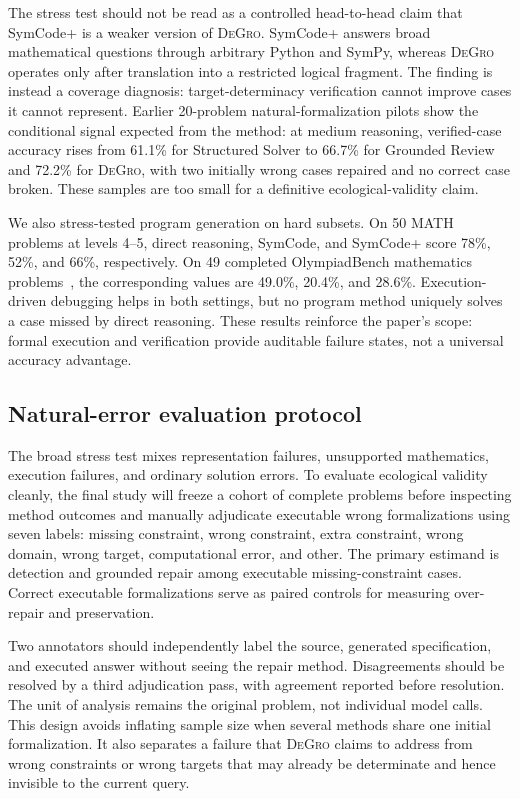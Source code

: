 \documentclass[sigconf,anonymous]{aamas}
\newcommand{\method}{\textsc{DeGro}}
\begin{document}
The stress test should not be read as a controlled head-to-head claim that SymCode+ is a weaker version of \method.  SymCode+ answers broad mathematical questions through arbitrary Python and SymPy, whereas \method{} operates only after translation into a restricted logical fragment.  The finding is instead a coverage diagnosis: target-determinacy verification cannot improve cases it cannot represent.  Earlier 20-problem natural-formalization pilots show the conditional signal expected from the method: at medium reasoning, verified-case accuracy rises from 61.1\% for Structured Solver to 66.7\% for Grounded Review and 72.2\% for \method, with two initially wrong cases repaired and no correct case broken.  These samples are too small for a definitive ecological-validity claim.

We also stress-tested program generation on hard subsets.  On 50 MATH problems at levels 4--5, direct reasoning, SymCode, and SymCode+ score 78\%, 52\%, and 66\%, respectively.  On 49 completed OlympiadBench mathematics problems~\cite{he2024olympiadbench}, the corresponding values are 49.0\%, 20.4\%, and 28.6\%.  Execution-driven debugging helps in both settings, but no program method uniquely solves a case missed by direct reasoning.  These results reinforce the paper's scope: formal execution and verification provide auditable failure states, not a universal accuracy advantage.

\subsection{Natural-error evaluation protocol}
The broad stress test mixes representation failures, unsupported mathematics, execution failures, and ordinary solution errors.  To evaluate ecological validity cleanly, the final study will freeze a cohort of complete problems before inspecting method outcomes and manually adjudicate executable wrong formalizations using seven labels: missing constraint, wrong constraint, extra constraint, wrong domain, wrong target, computational error, and other.  The primary estimand is detection and grounded repair among executable missing-constraint cases.  Correct executable formalizations serve as paired controls for measuring over-repair and preservation.

Two annotators should independently label the source, generated specification, and executed answer without seeing the repair method.  Disagreements should be resolved by a third adjudication pass, with agreement reported before resolution.  The unit of analysis remains the original problem, not individual model calls.  This design avoids inflating sample size when several methods share one initial formalization.  It also separates a failure that \method{} claims to address from wrong constraints or wrong targets that may already be determinate and hence invisible to the current query.
\end{document}
